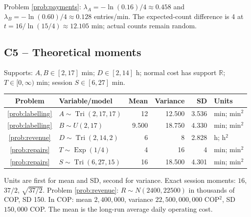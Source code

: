 Problem \ref{prob:payments}: $\lambda_A=-\ln(0.16)/4\approx0.458$ and $\lambda_B=-\ln(0.60)/4\approx0.128$ entries/min.
The expected-count difference is 4 at $t=16/\ln(15/4)\approx12.105$ min; actual counts remain random.
\clearpage\subsection*{C5 -- Theoretical moments}
Supports: $A,B\in[2,17]$ min; $D\in[2,14]$ h; normal cost has support $\mathbb R$; $T\in[0,\infty)$ min; session $S\in[6,27]$ min.
\begin{center}\begin{tabular}{clrrrl}
\toprule Problem&Variable/model&Mean&Variance&SD&Units\\\midrule
\ref{prob:labelling}&$A\sim\operatorname{Tri}(2,17,17)$&12&12.500&3.536&min; min$^2$\\
\ref{prob:labelling}&$B\sim U(2,17)$&9.500&18.750&4.330&min; min$^2$\\
\ref{prob:revenue}&$D\sim\operatorname{Tri}(2,14,2)$&6&8&2.828&h; h$^2$\\
\ref{prob:repairs}&$T\sim\operatorname{Exp}(1/4)$&4&16&4&min; min$^2$\\
\ref{prob:repairs}&$S\sim\operatorname{Tri}(6,27,15)$&16&18.500&4.301&min; min$^2$\\\bottomrule
\end{tabular}\end{center}
Units are first for mean and SD, second for variance. Exact session moments: $16$, $37/2$, $\sqrt{37/2}$.
Problem \ref{prob:revenue}: $R\sim N(2400,22500)$ in thousands of COP, SD 150.
In COP: mean $2{,}400{,}000$, variance $22{,}500{,}000{,}000$ COP$^2$, SD $150{,}000$ COP.
The mean is the long-run average daily operating cost.
